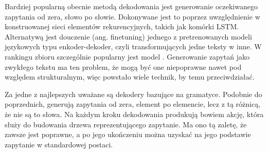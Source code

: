 Bardziej popularną obecnie metodą dekodowania jest generowanie oczekiwanego zapytania od zera, słowo po słowie. Dokonywane jest to poprzez uwzględnienie w konstruowanej sieci elementów rekurencyjnych, takich jak komórki LSTM. Alternatywą jest douczenie (ang. finetuning) jednego z pretrenowanych modeli językowych typu enkoder-dekoder, czyli transformujących jedne teksty w inne. W rankingu zbioru  szczególnie popularny jest model . Generowanie zapytań jako zwykłego tekstu ma ten problem, że mogą być one niepoprawne nawet pod względem strukturalnym, więc powstało wiele technik, by temu przeciwdziałać.

Za jedne z najlepszych uważane są dekodery bazujące na gramatyce. Podobnie do poprzednich, generują zapytania od zera, element po elemencie, lecz z tą różnicą, że nie są to słowa. Na każdym kroku dekodowania produkują bowiem akcję, która służy do budowania drzewa  reprezentującego zapytanie. Ma ono tą zaletę, że zawsze jest poprawne, a po jego ukończeniu można uzyskać na jego podstawie zapytanie w standardowej postaci.